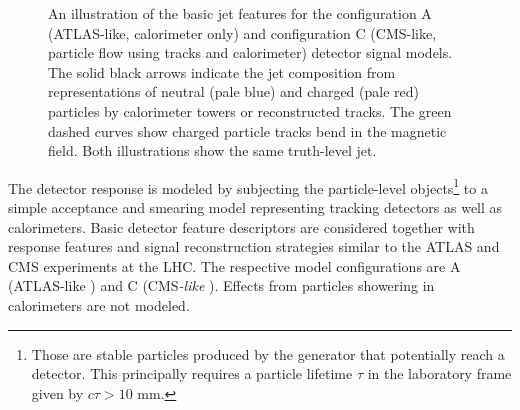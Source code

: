 \documentclass[11pt,letterpaper]{article}
\begin{document}
\begin{figure}
\begin{center}
\end{center}
\caption{An illustration of the basic jet features for the configuration A (ATLAS-like, calorimeter only) and configuration C (CMS-like, particle flow using tracks and calorimeter) detector signal models. The solid black arrows indicate the jet composition from representations of neutral (pale blue) and charged (pale red) particles by calorimeter towers or reconstructed tracks. The green dashed curves show charged particle tracks bend in the magnetic field. Both illustrations show the same truth-level jet.}
\label{jetsub_2prong_fig:detmodel}
\end{figure}


The detector response is modeled by subjecting the particle-level objects\footnote{Those are stable particles produced by the generator that potentially reach a detector.  This principally requires a particle lifetime $\tau$ in the laboratory frame given by $c\tau > 10$ mm.}
to a simple acceptance and smearing model representing tracking detectors as well as calorimeters.
%
Basic detector feature descriptors are considered together with response features and signal reconstruction strategies similar to the ATLAS and CMS experiments at the LHC.
%
The respective model configurations are A (ATLAS{-like} \cite{PERF-2007-01}) and C (CMS\emph{-like} \cite{CMS-TDR-08-001}).
%
Effects from particles showering in calorimeters are not modeled. 
\end{document}
